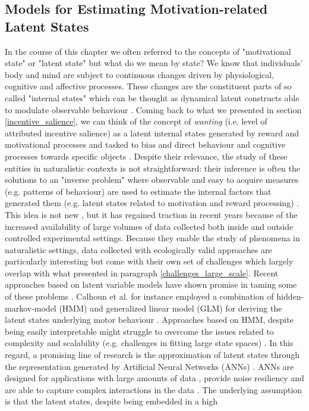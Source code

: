 \subsection{Models for Estimating Motivation-related Latent States}
\label{latent_states_estimation}
In the course of this chapter we often referred to the concepts of "motivational state" or "latent state" but what do we mean by state? We know that individuals' body and mind are subject to continuous changes driven by physiological, cognitive and affective processes. These changes are the constituent parts of so called "internal states"  which can be thought as dynamical latent constructs able to modulate observable behaviour \cite{eyjolfsdottir2016learning,song2017reward,merel2019deep,calhoun2019unsupervised}. Coming back to what we presented in section \ref{incentive_salience}, we can think of the concept of \textit{wanting} (i.e. level of attributed incentive salience) as a latent internal states generated by reward and motivational processes and tasked to bias and direct behaviour and cognitive processes towards specific objects \cite{berridge2008affective}. Despite their relevance, the study of these entities in naturalistic contexts is not straightforward: their inference is often the solutions to an "inverse problem" \cite{bishop2006pattern} where observable and easy to acquire measures (e.g. patterns of behaviour) are used to estimate the internal factors that generated them (e.g. latent states related to motivation and reward processing) \cite{song2017reward,wang2018prefrontal}. This idea is not new \cite{spearman1961general}, but it has regained traction in recent years because of the increased availability of large volumes of data collected both inside and outside controlled experimental settings. Because they enable the study of phenomena in naturalistic settings, data collected with ecologically valid approaches are particularly interesting but come with their own set of challenges \cite{hashem2015rise} which largely overlap with what presented in paragraph \ref{challenges_large_scale}. Recent approaches based on latent variable models have shown promise in taming some of these problems \cite{calhoun2019unsupervised}. Calhoun et al. for instance employed a combination of hidden-markov-model (HMM) and generalized linear model (GLM) for deriving the latent states underlying motor behaviour \cite{calhoun2019unsupervised}. Approaches based on HMM, despite being easily interpretable might struggle to overcome the issues related to complexity  \cite{eyjolfsdottir2016learning,schuster2007introduction} and scalability (e.g. challenges in fitting large state spaces) \cite{touloupou2020scalable}. In this regard, a promising line of research is the approximation of latent states through the representation generated by Artificial Neural Networks (ANNs) \cite{eyjolfsdottir2016learning,song2017reward,merel2019deep,luxem2020identifying, pereira2020quantifying, mccullough2021unsupervised, shi2021learning}. ANNs are designed for applications with large amounts of data \cite{oh2004gpu}, provide noise resiliency and are able to capture complex interactions in the data \cite{bengio2017deep}. The underlying assumption is that the latent states, despite being embedded in a high 